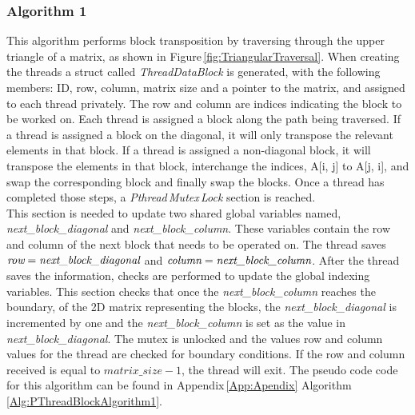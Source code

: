 \documentclass[10pt, onecolumn]{article}
\begin{document}
\subsubsection{Algorithm 1}
%
This algorithm performs block transposition by traversing through the upper triangle of a matrix, as shown in Figure\,\ref{fig:TriangularTraversal}. When creating the threads a struct called \emph{ThreadDataBlock} is generated, with the following members: ID, row, column, matrix size and a pointer to the matrix, and assigned to each thread privately. The row and column are indices indicating the block to be worked on. Each thread is assigned a block along the path being traversed. If a thread is assigned a block on the diagonal, it will only transpose the relevant elements in that block. If a thread is assigned a non-diagonal block, it will transpose the elements in that block, interchange the indices, A[i, j] to A[j, i], and swap the corresponding block and finally swap the blocks. Once a thread has completed those steps, a \emph{Pthread\,Mutex\,Lock} section is reached.\\

\noindent This section is needed to update two shared global variables named, \emph{next\_block\_diagonal} and \emph{next\_block\_column}. These variables contain the row and column of the next block that needs to be operated on. The thread saves $\emph{row} = \emph{next\_block\_diagonal}$ and $\emph{column} = \emph{next\_block\_column}$. After the thread saves the information, checks are performed to update the global indexing variables. This section checks that once the \emph{next\_block\_column} reaches the boundary, of the 2D matrix representing the blocks, the \emph{next\_block\_diagonal} is incremented by one and the \emph{next\_block\_column} is set as the value in \emph{next\_block\_diagonal}. The mutex is unlocked and the values row and column values for the thread are checked for boundary conditions. If the row and column received is equal to $matrix\_size - 1$, the thread will exit. The pseudo code code for this algorithm can be found in Appendix\,\ref{App:Apendix} Algorithm\,\ref{Alg:PThreadBlockAlgorithm1}.
%
\end{document}
